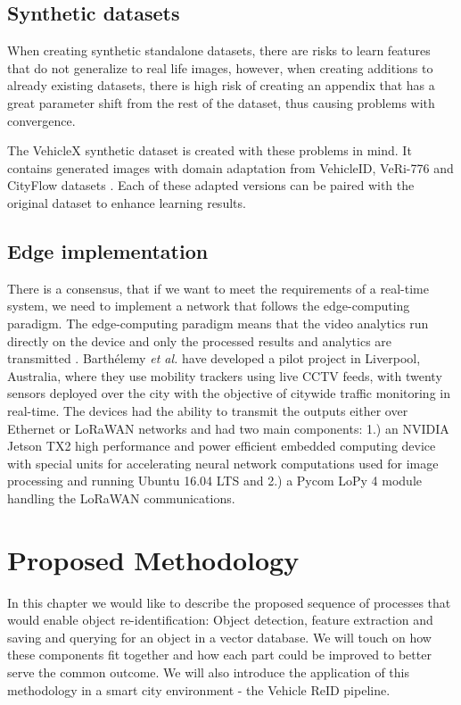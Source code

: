 \documentclass[conference]{IEEEtran} %
\begin{document}
	\subsection{Synthetic datasets}
		When creating synthetic standalone datasets, there are risks to learn features that do not generalize to real life images, however, when creating additions to already existing datasets, there is high risk of creating an appendix that has a great parameter shift from the rest of the dataset, thus causing problems with convergence. 
		
		The VehicleX synthetic dataset is created with these problems in mind. It contains generated images with domain adaptation from VehicleID, VeRi-776 and CityFlow datasets \cite{yao2020simulating}. Each of these adapted versions can be paired with the original dataset to enhance learning results.
		
	\subsection{Edge implementation}
		There is a consensus, that if we want to meet the requirements of a real-time system, we need to implement a network that follows the edge-computing paradigm. The edge-computing paradigm means that the video analytics run directly on the device and only the processed results and analytics are transmitted \cite{barthelemy2019edge}. Barthélemy \textit{et al.} have developed a pilot project in Liverpool, Australia, where they use mobility trackers using live CCTV feeds, with twenty sensors deployed over the city with the objective of citywide traffic monitoring in real-time. The devices had the ability to transmit the outputs either over Ethernet or LoRaWAN networks and had two main components: 1.) an NVIDIA Jetson TX2 high performance and power efficient embedded computing device with special units for accelerating neural network computations used for image processing and running Ubuntu 16.04 LTS and 2.) a Pycom LoPy 4 module handling the LoRaWAN communications.
		 
	
	
	
	
\section{Proposed Methodology}
	
	In this chapter we would like to describe the proposed sequence of processes that would enable object re-identification: Object detection, feature extraction and saving and querying for an object in a vector database. We will touch on how these components fit together and how each part could be improved to better serve the common outcome. We will also introduce the application of this methodology in a smart city environment - the Vehicle ReID pipeline.
	
\end{document}
